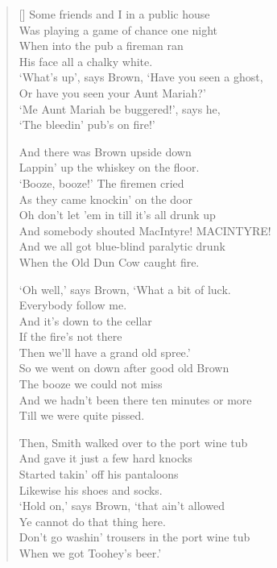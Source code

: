 \pagebreak
\settowidth{\versewidth}{So we went on down after good old Brown}
\begin{verse}[\versewidth]
Some friends and I in a public house\\
Was playing a game of chance one night\\
When into the pub a fireman ran\\
His face all a chalky white.\\
`What's up', says Brown, `Have you seen a ghost,\\
Or have you seen your Aunt Mariah?'\\
`Me Aunt Mariah be buggered!', says he,\\
`The bleedin' pub's on fire!'

\begin{chorus}
And there was Brown upside down\\
    Lappin' up the whiskey on the floor.\\
    `Booze, booze!' The firemen cried\\
    As they came knockin' on the door\\
    Oh don't let 'em in till it's all drunk up\\
    And somebody shouted MacIntyre! MACINTYRE!\\
    And we all got blue-blind paralytic drunk\\
    When the Old Dun Cow caught fire.
    \end{chorus}

`Oh well,' says Brown, `What a bit of luck.\\
Everybody follow me.\\
And it's down to the cellar\\
If the fire's not there\\
Then we'll have a grand old spree.'\\
So we went on down after good old Brown\\
The booze we could not miss\\
And we hadn't been there ten minutes or more\\
Till we were quite pissed.


Then, Smith walked over to the port wine tub\\
And gave it just a few hard knocks\\
Started takin' off his pantaloons\\
Likewise his shoes and socks.\\
`Hold on,' says Brown, `that ain't allowed\\
Ye cannot do that thing here.\\
Don't go washin' trousers in the port wine tub\\
When we got Toohey's beer.'


\end{verse}
